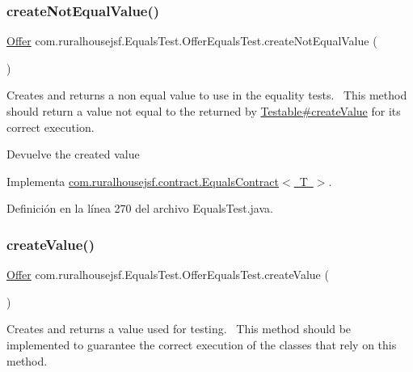 \subsubsection{\texorpdfstring{createNotEqualValue()}{createNotEqualValue()}}
{\footnotesize\ttfamily \mbox{\hyperlink{classcom_1_1ruralhousejsf_1_1domain_1_1_offer}{Offer}} com.\+ruralhousejsf.\+Equals\+Test.\+Offer\+Equals\+Test.\+create\+Not\+Equal\+Value (\begin{DoxyParamCaption}{ }\end{DoxyParamCaption})}

Creates and returns a non equal value to use in the equality tests.~\newline
 This method should return a value not equal to the returned by \mbox{\hyperlink{}{Testable\#create\+Value}} for its correct execution.

\begin{DoxyReturn}{Devuelve}
the created value 
\end{DoxyReturn}


Implementa \mbox{\hyperlink{interfacecom_1_1ruralhousejsf_1_1contract_1_1_equals_contract_a65840509b57f6b89e42e2abf1978aa01}{com.\+ruralhousejsf.\+contract.\+Equals\+Contract$<$ T $>$}}.



Definición en la línea 270 del archivo Equals\+Test.\+java.

\mbox{\label{classcom_1_1ruralhousejsf_1_1_equals_test_1_1_offer_equals_test_a25524d0ab8278899774751c0f7630e8d}} 
\subsubsection{\texorpdfstring{createValue()}{createValue()}}
{\footnotesize\ttfamily \mbox{\hyperlink{classcom_1_1ruralhousejsf_1_1domain_1_1_offer}{Offer}} com.\+ruralhousejsf.\+Equals\+Test.\+Offer\+Equals\+Test.\+create\+Value (\begin{DoxyParamCaption}{ }\end{DoxyParamCaption})}

Creates and returns a value used for testing.~\newline
 This method should be implemented to guarantee the correct execution of the classes that rely on this method.

